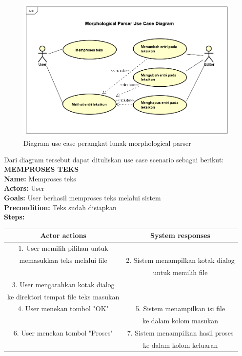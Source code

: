 \begin{figure}[H]
\centering
\includegraphics[scale=0.56]{Gambar/gambar-diagram-use-case}
\caption[Diagram use case perangkat lunak morphological parser]{Diagram use case perangkat lunak morphological parser} 
\label{gambar-diagram-use-case}
\end{figure}

Dari diagram tersebut dapat dituliskan use case scenario sebagai berikut:\\

\textbf{MEMPROSES TEKS}\\
\textbf{Name:} Memproses teks\\
\textbf{Actors:} User\\
\textbf{Goals:} User berhasil memproses teks melalui sistem\\
\textbf{Precondition:} Teks sudah disiapkan\\
\textbf{Steps:}

\begin{table}[H]
\centering
\begin{tabular}{|c|c|}
\hline
\textbf{Actor actions} & \textbf{System responses} \\
\hline
1. User memilih pilihan untuk& \\memasukkan teks melalui file&
2. Sistem menampilkan kotak dialog \\&untuk memilih file\\
3. User mengarahkan kotak dialog&\\ ke direktori tempat file teks masukan&\\
4. User menekan tombol "OK"&
5. Sistem menampilkan isi file \\&ke dalam kolom masukan\\
6. User menekan tombol "Proses"&7. Sistem menampilkan hasil proses\\&ke dalam kolom keluaran\\
\hline
\end{tabular}
\end{table}

